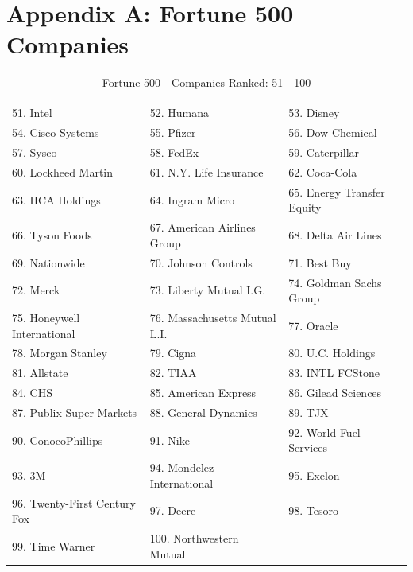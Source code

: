 \documentclass{article}
\begin{document}
\section{Appendix A: Fortune 500 Companies} \label{appA}
\begin{table}[H]
\centering
\caption{Fortune 500 - Companies Ranked: 51 - 100}
\begin{tabular}{lll}
\hline
 & & \\
51. Intel
& 52. Humana
& 53. Disney
 \\ 
 54. Cisco Systems
& 55. Pfizer
& 56. Dow Chemical
 \\ 
57. Sysco
& 58. FedEx
& 59. Caterpillar
 \\ 
60. Lockheed Martin
& 61. N.Y. Life Insurance
& 62. Coca-Cola
 \\ 
63. HCA Holdings
& 64. Ingram Micro
& 65. Energy Transfer Equity
 \\ 
66. Tyson Foods
& 67. American Airlines Group
& 68. Delta Air Lines
 \\ 
69. Nationwide
& 70. Johnson Controls
& 71. Best Buy
 \\ 
72. Merck
& 73. Liberty Mutual I.G.
& 74. Goldman Sachs Group
 \\ 
75. Honeywell International
& 76. Massachusetts Mutual L.I.
& 77. Oracle
 \\ 
78. Morgan Stanley
& 79. Cigna
& 80. U.C. Holdings
 \\ 
81. Allstate
& 82. TIAA
& 83. INTL FCStone
 \\ 
84. CHS
& 85. American Express
& 86. Gilead Sciences
 \\ 
87. Publix Super Markets
& 88. General Dynamics
& 89. TJX
 \\ 
90. ConocoPhillips
& 91. Nike
& 92. World Fuel Services
 \\ 
93. 3M
& 94. Mondelez International
& 95. Exelon
 \\ 
96. Twenty-First Century Fox
& 97. Deere
& 98. Tesoro
 \\ 
99. Time Warner
& 100. Northwestern Mutual
 &
 \\ \hline

\end{tabular}
\end{table}
\end{document}
